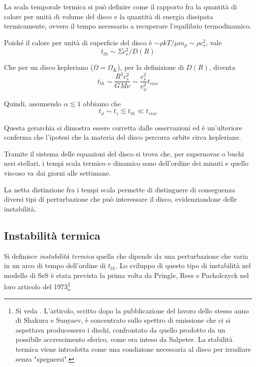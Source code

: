 \documentclass[a4paperbi]{article}
\begin{document}
	La scala temporale termica si può definire come il rapporto fra la quantità di calore per unità di volume del disco e la quantità di energia dissipata termicamente, ovvero il tempo necessario a recuperare l'equilibrio termodinamico.
	
	Poiché il calore per unità di superficie del disco è $\sim\rho kT/\mu m_p\sim\rho c_s^2$, vale
	\begin{equation*}
		t_{th}\sim\Sigma c_s^2/D(R)
	\end{equation*}
	
	Che per un disco kepleriano ($\Omega=\Omega_K$), per la definizione di $D(R)$, diventa
	\begin{equation}
		t_{th}\sim\frac{R^3c_s^2}{GM\nu}\sim\frac{c_s^2}{v_\phi^2}t_{visc}
	\end{equation}
	
	Quindi, assumendo $\alpha\lesssim1$ abbiamo che
	\begin{equation}
		t_\phi\sim t_z\lesssim t_{th}\ll t_{visc}	
	\end{equation}

	Questa gerarchia si dimostra essere corretta dalle osservazioni ed è un'ulteriore conferma che l'ipotesi che la materia del disco percorra orbite circa kepleriane.

	Tramite il sistema delle equazioni del disco si trova che, per supernovae o buchi neri stellari, i tempi scala termico e dinamico sono dell'ordine dei minuti e quello viscoso va dai giorni alle settimane.

	La netta distinzione fra i tempi scala permette di distinguere di conseguenza diversi tipi di perturbazione che può interessare il disco, evidenziandone delle instabilità.
	
\subsection{Instabilità termica}
	
	Si definisce \textit{instabilità termica} quella che dipende da una perturbazione che varia in un arco di tempo dell'ordine di $t_{th}$. Lo sviluppo di questo tipo di instabilità nel modello di SeS è stata prevista la prima volta da Pringle, Rees e Pacholczyck nel loro articolo del 1973\footnote{Si veda \cite{PringleReesPacholczyk1973}. L'articolo, scritto dopo la pubblicazione del lavoro dello stesso anno di Shakura e Sunyaev, è concentrato sullo spettro di emissione che ci si aspettava producessero i dischi, confrontato da quello prodotto da un possibile accrescimento sferico, come era inteso da Salpeter. La stabilità termica viene introdotta come una condizione necessaria al disco per irradiare senza "spegnersi".}
\end{document}
